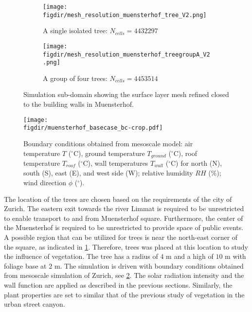 \begin{figure}[p]
	\centering
	\begin{subfigure}[b]{0.8\linewidth}
		\texttt{[image: \\figdir/mesh\_resolution\_muensterhof\_tree\_V2.png]}
		\caption{A single isolated tree: $N_{\textit{cells}} = \num{4432297}$}%
	\end{subfigure}
	
	\medskip
	
	\begin{subfigure}[b]{0.8\linewidth}
		\texttt{[image: \\figdir/mesh\_resolution\_muensterhof\_treegroupA\_V2.png]}
		\caption{A group of four trees: $N_{\textit{cells}} = \num{4453514}$}%
	\end{subfigure}
	\caption{Simulation sub-domain showing the surface layer mesh refined closed to the building walls in Muensterhof.}
	\label{fig:mesh_resolution_muensterhof_tree}
\end{figure}

\begin{figure}[p]
	\centering
	\texttt{[image: \\figdir/muensterhof\_basecase\_bc-crop.pdf]}
	\caption{Boundary conditions obtained from mesoscale model:  air temperature $T$ ($^{\circ}$C), ground temperature $T_{\textit{ground}}$ ($^{\circ}$C), roof temperature $T_{\textit{roof}}$ ($^{\circ}$C), wall temperatures $T_{\textit{wall}}$ ($^{\circ}$C) for north (N), south (S), east (E), and west side (W);  relative humidity $RH$ (\%);  wind direction $\phi$ ($^{\circ}$). }
	\label{fig:muensterhof_bc}
\end{figure}


The location of the trees are chosen based on the requirements of the city of Zurich. The eastern exit towards the river Limmat is required to be unrestricted to enable transport to and from Muensterhof square. Furthermore, the center of the Muensterhof is required to be unrestricted to provide space of public events. A possible region that can be utilized for trees is near the north-east corner of the square, as indicated in \cref{fig:mesh_resolution_muensterhof_tree}. Therefore, trees was placed at this location to study the influence of vegetation. The tree has a radius of $4$ m and a high of $10$ m with foliage base at $2$ m. The simulation is driven with boundary conditions obtained from mesoscale simulation of Zurich, see \cref{fig:muensterhof_bc}. The solar radiation intensity and the wall function are applied as described in the previous sections. Similarly, the plant properties are set to similar that of the previous study of vegetation in the urban street canyon. 

